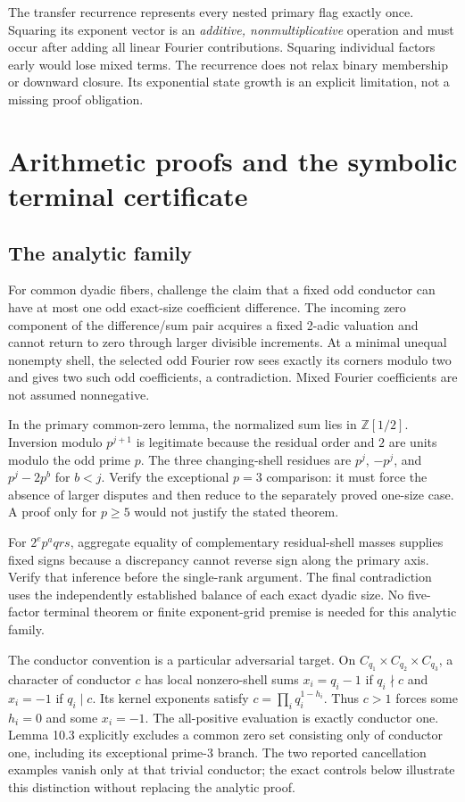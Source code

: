 \documentclass[10pt]{article}
\newcommand{\Z}{\mathbb Z}
\begin{document}
The transfer recurrence represents every nested primary flag exactly
once. Squaring its exponent vector is an \emph{additive, nonmultiplicative}
operation and must occur after adding all linear Fourier contributions.
Squaring individual factors early would lose mixed terms. The recurrence
does not relax binary membership or downward closure. Its exponential
state growth is an explicit limitation, not a missing proof obligation.

\newpage
\section{Arithmetic proofs and the symbolic terminal certificate}

\subsection{The analytic family}
For common dyadic fibers, challenge the claim that a fixed odd conductor
can have at most one odd exact-size coefficient difference. The incoming
zero component of the difference/sum pair acquires a fixed 2-adic
valuation and cannot return to zero through larger divisible increments.
At a minimal unequal nonempty shell, the selected odd Fourier row sees
exactly its corners modulo two and gives two such odd coefficients, a
contradiction. Mixed Fourier coefficients are not assumed nonnegative.

In the primary common-zero lemma, the normalized sum lies in
$\Z[1/2]$. Inversion modulo $p^{j+1}$ is legitimate because the residual
order and $2$ are units modulo the odd prime $p$. The three changing-shell
residues are $p^j$, $-p^j$, and $p^j-2p^b$ for $b<j$. Verify the
exceptional $p=3$ comparison: it must force the absence of larger
disputes and then reduce to the separately proved one-size case. A proof
only for $p\ge5$ would not justify the stated theorem.

For $2^ep^aqrs$, aggregate equality of complementary residual-shell
masses supplies fixed signs because a discrepancy cannot reverse sign
along the primary axis. Verify that inference before the single-rank
argument. The final contradiction uses the independently established
balance of each exact dyadic size. No five-factor terminal theorem or
finite exponent-grid premise is needed for this analytic family.

The conductor convention is a particular adversarial target. On
$C_{q_1}\times C_{q_2}\times C_{q_3}$, a character of conductor $c$
has local nonzero-shell sums $x_i=q_i-1$ if $q_i\nmid c$ and
$x_i=-1$ if $q_i\mid c$. Its kernel exponents satisfy
$c=\prod_iq_i^{1-h_i}$. Thus $c>1$ forces some $h_i=0$ and
some $x_i=-1$. The all-positive evaluation is exactly conductor one.
Lemma 10.3 explicitly excludes a common zero set consisting only of
conductor one, including its exceptional prime-$3$ branch. The two
reported cancellation examples vanish only at that trivial conductor;
the exact controls below illustrate this distinction without replacing
the analytic proof.
\end{document}

